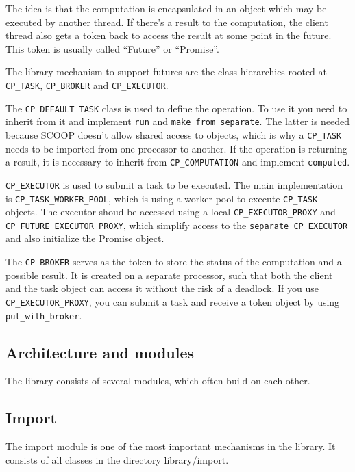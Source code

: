 \documentclass[a4paper,10pt]{report}
\newcommand{\dir} [1] [] {#1}
\begin{document}
The idea is that the computation is encapsulated in an object which may be executed by another thread.
If there's a result to the computation, the client thread also gets a token back to access the result at some point in the future.
This token is usually called ``Future'' or ``Promise''.

The library mechanism to support futures are the class hierarchies rooted at \lstinline!CP_TASK!, \lstinline!CP_BROKER! and \lstinline!CP_EXECUTOR!.

The \lstinline!CP_DEFAULT_TASK! class is used to define the operation.
To use it you need to inherit from it and implement \lstinline!run! and \lstinline!make_from_separate!.
The latter is needed because SCOOP doesn't allow shared access to objects, which is why a \lstinline!CP_TASK! needs to be imported from one processor to another.
If the operation is returning a result, it is necessary to inherit from \lstinline!CP_COMPUTATION! and implement \lstinline!computed!.

\lstinline!CP_EXECUTOR! is used to submit a task to be executed.
The main implementation is \lstinline!CP_TASK_WORKER_POOL!, which is using a worker pool to execute \lstinline!CP_TASK! objects.
The executor shoud be accessed using a local \lstinline!CP_EXECUTOR_PROXY! and \lstinline!CP_FUTURE_EXECUTOR_PROXY!, which simplify access to the \lstinline!separate CP_EXECUTOR! and also initialize the Promise object.

The \lstinline!CP_BROKER! serves as the token to store the status of the computation and a possible result.
It is created on a separate processor, such that both the client and the task object can access it without the risk of a deadlock.
If you use \lstinline!CP_EXECUTOR_PROXY!, you can submit a task and receive a token object by using \lstinline!put_with_broker!.



\subsection {Architecture and modules}
\label{sec:modules}

The library consists of several modules, which often build on each other.

\subsection{Import}

The import module is one of the most important mechanisms in the library.
It consists of all classes in the directory \dir{library/import}.
\end{document}
